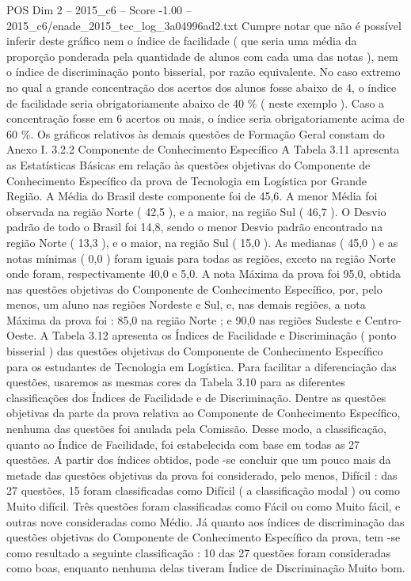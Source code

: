 \begin{textsample}{POS Dim 2 – 2015\_c6 – Score -1.00 – 2015\_c6/enade\_2015\_tec\_log\_3a04996ad2.txt}
Cumpre notar que não é possível inferir deste gráfico nem o índice de facilidade ( que seria uma média da proporção ponderada pela quantidade de alunos com cada uma das notas ), nem o índice de discriminação ponto bisserial, por razão equivalente.
No caso extremo no qual a grande concentração dos acertos dos alunos fosse abaixo de 4, o índice de facilidade seria obrigatoriamente abaixo de 40 \% ( neste exemplo ).
Caso a concentração fosse em 6 acertos ou mais, o índice seria obrigatoriamente acima de 60 \%.
Os gráficos relativos às demais questões de Formação Geral constam do Anexo I. 3.2.2 Componente de Conhecimento Específico A Tabela 3.11 apresenta as Estatísticas Básicas em relação às questões objetivas do Componente de Conhecimento Específico da prova de Tecnologia em Logística por Grande Região.
A Média do Brasil deste componente foi de 45,6.
A menor Média foi observada na região Norte ( 42,5 ), e a maior, na região Sul ( 46,7 ).
O Desvio padrão de todo o Brasil foi 14,8, sendo o menor Desvio padrão encontrado na região Norte ( 13,3 ), e o maior, na região Sul ( 15,0 ).
As medianas ( 45,0 ) e as notas mínimas ( 0,0 ) foram iguais para todas as regiões, exceto na região Norte onde foram, respectivamente 40,0 e 5,0.
A nota Máxima da prova foi 95,0, obtida nas questões objetivas do Componente de Conhecimento Específico, por, pelo menos, um aluno nas regiões Nordeste e Sul, e, nas demais regiões, a nota Máxima da prova foi : 85,0 na região Norte ; e 90,0 nas regiões Sudeste e Centro-Oeste.
A Tabela 3.12 apresenta os Índices de Facilidade e Discriminação ( ponto bisserial ) das questões objetivas do Componente de Conhecimento Específico para os estudantes de Tecnologia em Logística.
Para facilitar a diferenciação das questões, usaremos as mesmas cores da Tabela 3.10 para as diferentes classificações dos Índices de Facilidade e de Discriminação.
Dentre as questões objetivas da parte da prova relativa ao Componente de Conhecimento Específico, nenhuma das questões foi anulada pela Comissão.
Desse modo, a classificação, quanto ao Índice de Facilidade, foi estabelecida com base em todas as 27 questões.
A partir dos índices obtidos, pode -se concluir que um pouco mais da metade das questões objetivas da prova foi considerado, pelo menos, Difícil : das 27 questões, 15 foram classificadas como Difícil ( a classificação modal ) ou como Muito difícil.
Três questões foram classificadas como Fácil ou como Muito fácil, e outras nove consideradas como Médio.
Já quanto aos índices de discriminação das questões objetivas do Componente de Conhecimento Específico da prova, tem -se como resultado a seguinte classificação : 10 das 27 questões foram consideradas como boas, enquanto nenhuma delas tiveram Índice de Discriminação Muito bom.

\end{textsample}
